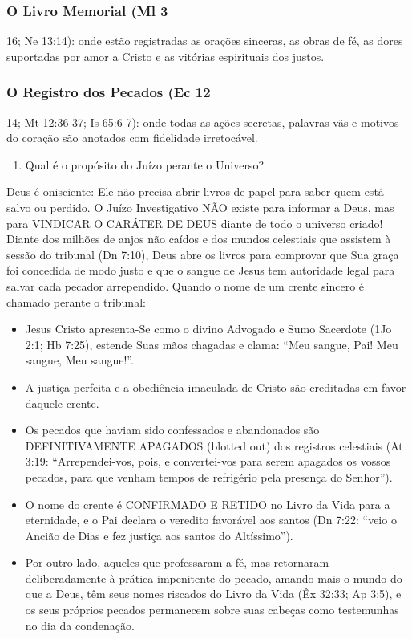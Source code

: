 \documentclass[11pt,a4paper,openany]{book}
\begin{document}
\subsubsection*{O Livro Memorial (Ml 3}
16; Ne 13:14): onde estão registradas as orações sinceras, as obras de fé, as dores suportadas por amor a Cristo e as vitórias espirituais dos justos.

\subsubsection*{O Registro dos Pecados (Ec 12}
14; Mt 12:36-37; Is 65:6-7): onde todas as ações secretas, palavras vãs e motivos do coração são anotados com fidelidade irretocável.

\begin{enumerate}
  \item Qual é o propósito do Juízo perante o Universo?
\end{enumerate}

Deus é onisciente: Ele não precisa abrir livros de papel para saber quem está salvo ou perdido. O Juízo Investigativo NÃO existe para informar a Deus, mas para VINDICAR O CARÁTER DE DEUS diante de todo o universo criado!
Diante dos milhões de anjos não caídos e dos mundos celestiais que assistem à sessão do tribunal (Dn 7:10), Deus abre os livros para comprovar que Sua graça foi concedida de modo justo e que o sangue de Jesus tem autoridade legal para salvar cada pecador arrependido. Quando o nome de um crente sincero é chamado perante o tribunal:
\begin{itemize}
  \item Jesus Cristo apresenta-Se como o divino Advogado e Sumo Sacerdote (1Jo 2:1; Hb 7:25), estende Suas mãos chagadas e clama: ``Meu sangue, Pai! Meu sangue, Meu sangue!''.
  \item A justiça perfeita e a obediência imaculada de Cristo são creditadas em favor daquele crente.
  \item Os pecados que haviam sido confessados e abandonados são DEFINITIVAMENTE APAGADOS (blotted out) dos registros celestiais (At 3:19: ``Arrependei-vos, pois, e convertei-vos para serem apagados os vossos pecados, para que venham tempos de refrigério pela presença do Senhor'').
  \item O nome do crente é CONFIRMADO E RETIDO no Livro da Vida para a eternidade, e o Pai declara o veredito favorável aos santos (Dn 7:22: ``veio o Ancião de Dias e fez justiça aos santos do Altíssimo'').
  \item Por outro lado, aqueles que professaram a fé, mas retornaram deliberadamente à prática impenitente do pecado, amando mais o mundo do que a Deus, têm seus nomes riscados do Livro da Vida (Êx 32:33; Ap 3:5), e os seus próprios pecados permanecem sobre suas cabeças como testemunhas no dia da condenação.
\end{itemize}
\end{document}
